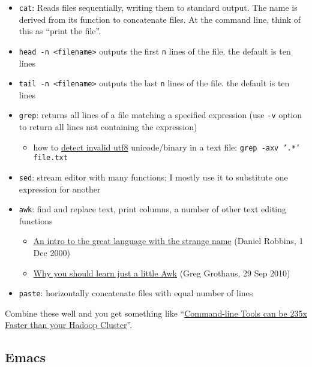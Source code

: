 \begin{itemize}
	\item \texttt{cat}: Reads files sequentially, writing them to standard output. The name is derived from its function to concatenate files. At the command line, think of this as ``print the file''.
	\item \texttt{head -n <filename>} outputs the first \texttt{n} lines of the file. the default is ten lines
	\item \texttt{tail -n <filename>} outputs the last \texttt{n} lines of the file. the default is ten lines
	\item \texttt{grep}: returns all lines of a file matching a specified expression (use \texttt{-v} option to return all lines not containing the expression)
	\begin{itemize}
		\item how to \href{https://stackoverflow.com/questions/29465612/how-to-detect-invalid-utf8-unicode-binary-in-a-text-file}{detect invalid utf8} unicode/binary in a text file: \texttt{grep -axv '.*' file.txt}
	\end{itemize}
	\item \texttt{sed}: stream editor with many functions; I mostly use it to substitute one expression for another
	\item \texttt{awk}: find and replace text, print columns, a number of other text editing functions
	\begin{itemize}
		\item \href{https://developer.ibm.com/tutorials/l-awk1/}{An intro to the great language with the strange name} (Daniel Robbins, 1 Dec 2000)
		\item \href{https://gregable.com/2010/09/why-you-should-know-just-little-awk.html}{Why you should learn just a little Awk} (Greg Grothaus, 29 Sep 2010)
	\end{itemize}
	\item \texttt{paste}: horizontally concatenate files with equal number of lines
\end{itemize}

Combine these well and you get something like 
``\href{https://adamdrake.com/command-line-tools-can-be-235x-faster-than-your-hadoop-cluster.html}{Command-line Tools can be 235x Faster than your Hadoop Cluster}''.

\subsection{Emacs}

